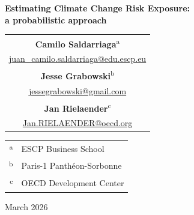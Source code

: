 \documentclass[12pt]{article}
\begin{document}
\thispagestyle{empty}

\vspace*{4cm}

\begin{center}

{\LARGE\bfseries Estimating Climate Change Risk Exposure:\\[0.4em] a probabilistic approach}

\vspace{2.5cm}

{\large
\begin{tabular}{c}
\textbf{Camilo Saldarriaga}\textsuperscript{a} \\[0.3em]
\href{mailto:juan_camilo.saldarriaga@edu.escp.eu}{juan\_camilo.saldarriaga@edu.escp.eu} \\[1.5em]
\textbf{Jesse Grabowski}\textsuperscript{b} \\[0.3em]
\href{mailto:jessegrabowski@gmail.com}{jessegrabowski@gmail.com} \\[1.5em]
\textbf{Jan Rielaender}\textsuperscript{c} \\[0.3em]
\href{mailto:Jan.RIELAENDER@oecd.org}{Jan.RIELAENDER@oecd.org} \\
\end{tabular}
}

\vspace{2.5cm}

{\normalsize
\begin{tabular}{rl}
\textsuperscript{a} & ESCP Business School \\[0.5em]
\textsuperscript{b} & Paris-1 Panth\'{e}on-Sorbonne \\[0.5em]
\textsuperscript{c} & OECD Development Center \\
\end{tabular}
}

\vfill

{\normalsize March 2026}

\end{center}
\end{document}
